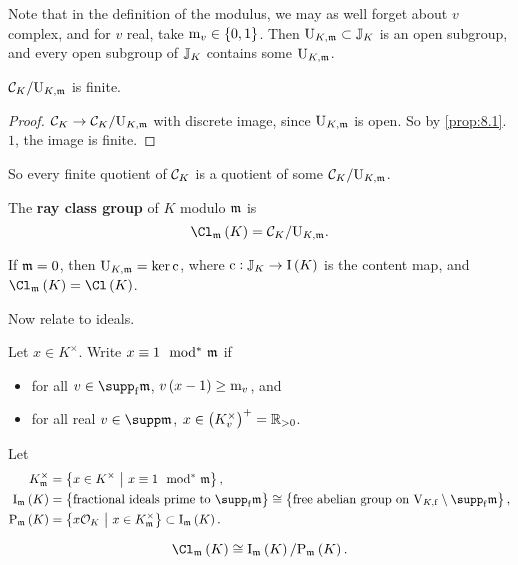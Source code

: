 Note that in the definition of the modulus, we may as well forget about $ v $ complex, and for $ v $ real, take $ \m_v \in \cbr{0, 1} $. Then $ \mathrm{U}_{K, \mathfrak{m}} \subset \mathbb{J}_K $ is an open subgroup, and every open subgroup of $ \mathbb{J}_K $ contains some $ \mathrm{U}_{K, \mathfrak{m}} $.

\begin{proposition}
$ \mathcal{C}_K / \mathrm{U}_{K, \mathfrak{m}} $ is finite.
\end{proposition}

\begin{proof}
$ \mathcal{C}_K \to \mathcal{C}_K / \mathrm{U}_{K, \mathfrak{m}} $ with discrete image, since $ \mathrm{U}_{K, \mathfrak{m}} $ is open. So by \ref{prop:8.1}.$ 1 $, the image is finite.
\end{proof}

So every finite quotient of $ \mathcal{C}_K $ is a quotient of some $ \mathcal{C}_K / \mathrm{U}_{K, \mathfrak{m}} $.

\begin{definition*}
The \textbf{ray class group} of $ K $ modulo $ \mathfrak{m} $ is
$$ \Cl_\mmm\br{K} = \CCC_K / \U_{K, \mmm}. $$
\end{definition*}

\begin{example*}
If $ \mathfrak{m} = 0 $, then $ \mathrm{U}_{K, \mathfrak{m}} = \ker \mathrm{c} $, where $ \c : \JJ_K \to \I\br{K} $ is the content map, and $ \Cl_\mmm\br{K} = \Cl\br{K} $.
\end{example*}

Now relate to ideals.

\begin{notation*}
Let $ x \in K^\times $. Write $ x \equiv 1 \mod\!\!^*\  \mathfrak{m} $ if
\begin{itemize}
\item for all $ v \in \supp_\f \mmm $, $ v\br{x - 1} \ge \m_v $, and
\item for all real $ v \in \supp \mmm $, $ x \in \br{K_v^\times}^+ = \RR_{> 0} $.
\end{itemize}
Let
\begin{align*}
K_\mmm^\times & = \cbr{x \in K^\times \st x \equiv 1 \mods \mmm}, \\
\I_\mmm\br{K} & = \cbr{\text{fractional ideals prime to} \ \supp_\f \mmm} \cong \cbr{\text{free abelian group on} \ \V_{K, \f} \setminus \supp_\f \mmm}, \\
\P_\mmm\br{K} & = \cbr{x\OOO_K \st x \in K_\mmm^\times} \subset \I_\mmm\br{K}.
\end{align*}
\end{notation*}

\begin{theorem}
$$ \Cl_\mmm\br{K} \cong \I_\mmm\br{K} / \P_\mmm\br{K}. $$
\end{theorem}

